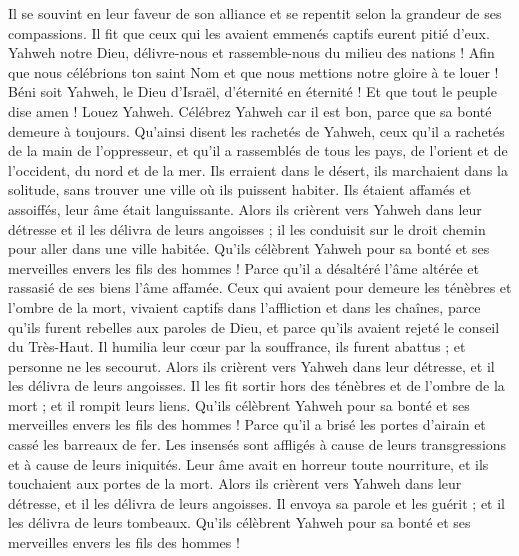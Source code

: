 \begin{multicols}{2}
Il se souvint en leur faveur de son alliance et se repentit selon la grandeur de ses compassions.
Il fit que ceux qui les avaient emmenés captifs eurent pitié d'eux.
Yahweh notre Dieu, délivre-nous et rassemble-nous du milieu des nations ! Afin que nous célébrions ton saint Nom et que nous mettions notre gloire à te louer !
Béni soit Yahweh, le Dieu d'Israël, d'éternité en éternité ! Et que tout le peuple dise amen ! Louez Yahweh.
\VerseOne{}Célébrez Yahweh car il est bon, parce que sa bonté demeure à toujours.
Qu'ainsi disent les rachetés de Yahweh, ceux qu'il a rachetés de la main de l'oppresseur,
et qu'il a rassemblés de tous les pays, de l'orient et de l'occident, du nord et de la mer.
Ils erraient dans le désert, ils marchaient dans la solitude, sans trouver une ville où ils puissent habiter.
Ils étaient affamés et assoiffés, leur âme était languissante.
Alors ils crièrent vers Yahweh dans leur détresse et il les délivra de leurs angoisses ;
il les conduisit sur le droit chemin pour aller dans une ville habitée.
Qu'ils célèbrent Yahweh pour sa bonté et ses merveilles envers les fils des hommes !
Parce qu'il a désaltéré l'âme altérée et rassasié de ses biens l'âme affamée.
Ceux qui avaient pour demeure les ténèbres et l'ombre de la mort, vivaient captifs dans l'affliction et dans les chaînes,
parce qu'ils furent rebelles aux paroles de Dieu, et parce qu'ils avaient rejeté le conseil du Très-Haut.
Il humilia leur cœur par la souffrance, ils furent abattus ; et personne ne les secourut.
Alors ils crièrent vers Yahweh dans leur détresse, et il les délivra de leurs angoisses.
Il les fit sortir hors des ténèbres et de l'ombre de la mort ; et il rompit leurs liens.
Qu'ils célèbrent Yahweh pour sa bonté et ses merveilles envers les fils des hommes !
Parce qu'il a brisé les portes d'airain et cassé les barreaux de fer.
Les insensés sont affligés à cause de leurs transgressions et à cause de leurs iniquités.
Leur âme avait en horreur toute nourriture, et ils touchaient aux portes de la mort.
Alors ils crièrent vers Yahweh dans leur détresse, et il les délivra de leurs angoisses.
Il envoya sa parole et les guérit ; et il les délivra de leurs tombeaux.
Qu'ils célèbrent Yahweh pour sa bonté et ses merveilles envers les fils des hommes !

\end{multicols}
